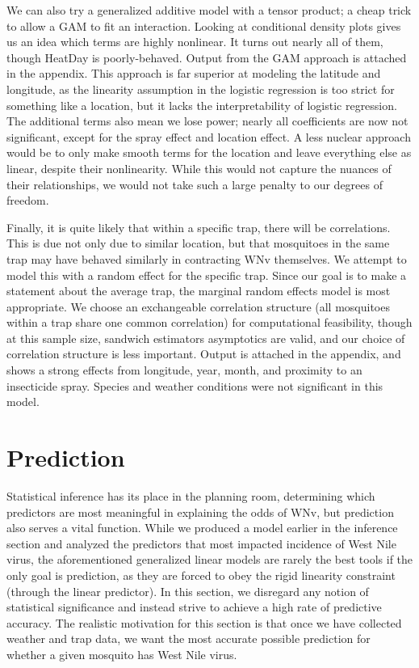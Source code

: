 \documentclass[12pt]{article}
\begin{document}
We can also try a generalized additive model with a tensor product; a cheap trick to allow a GAM to fit an interaction. Looking at conditional density plots gives us an idea which terms are highly nonlinear. It turns out nearly all of them, though HeatDay is poorly-behaved. Output from the GAM approach is attached in the appendix. This approach is far superior at modeling the latitude and longitude, as the linearity assumption in the logistic regression is too strict for something like a location, but it lacks the interpretability of logistic regression. The additional terms also mean we lose power; nearly all coefficients are now not significant, except for the spray effect and location effect. A less nuclear approach would be to only make smooth terms for the location and leave everything else as linear, despite their nonlinearity. While this would not capture the nuances of their relationships, we would not take such a large penalty to our degrees of freedom.

Finally, it is quite likely that within a specific trap, there will be correlations. This is due not only due to similar location, but that mosquitoes in the same trap may have behaved similarly in contracting WNv themselves. We attempt to model this with a random effect for the specific trap. Since our goal is to make a statement about the average trap, the marginal random effects model is most appropriate. We choose an exchangeable correlation structure (all mosquitoes within a trap share one common correlation) for computational feasibility, though at this sample size, sandwich estimators asymptotics are valid, and our choice of correlation structure is less important. Output is attached in the appendix, and shows a strong effects from longitude, year, month, and proximity to an insecticide spray. Species and weather conditions were not significant in this model.

\section{Prediction}
Statistical inference has its place in the planning room, determining which predictors are most meaningful in explaining the odds of WNv, but prediction also serves a vital function. While we produced a model earlier in the inference section and analyzed the predictors that most impacted incidence of West Nile virus, the aforementioned generalized linear models are rarely the best tools if the only goal is prediction, as they are forced to obey the rigid linearity constraint (through the linear predictor). In this section, we disregard any notion of statistical significance and instead strive to achieve a high rate of predictive accuracy. The realistic motivation for this section is that once we have collected weather and trap data, we want the most accurate possible prediction for whether a given mosquito has West Nile virus.
\end{document}
